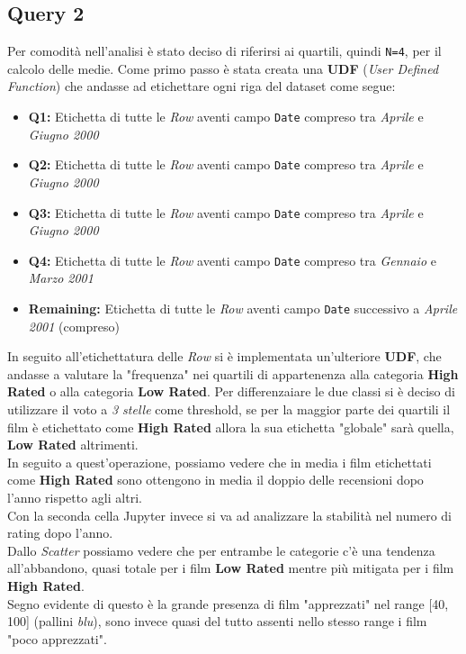 \documentclass{article}
\begin{document}
    \newpage
    \subsection{Query 2}
        Per comodità nell'analisi è stato deciso di riferirsi ai quartili, quindi \texttt{N=4}, per il calcolo delle medie. Come primo passo è stata creata una \textbf{UDF} (\textit{User Defined Function}) che andasse ad etichettare ogni riga del dataset come segue:
        \begin{itemize}
            \item \textbf{Q1:} Etichetta di tutte le \textit{Row} aventi campo \texttt{Date} compreso tra \textit{Aprile} e \textit{Giugno 2000}
            \item \textbf{Q2:} Etichetta di tutte le \textit{Row} aventi campo \texttt{Date} compreso tra \textit{Aprile} e \textit{Giugno 2000}
            \item \textbf{Q3:} Etichetta di tutte le \textit{Row} aventi campo \texttt{Date} compreso tra \textit{Aprile} e \textit{Giugno 2000}
            \item \textbf{Q4:} Etichetta di tutte le \textit{Row} aventi campo \texttt{Date} compreso tra \textit{Gennaio} e \textit{Marzo 2001}
            \item \textbf{Remaining:} Etichetta di tutte le \textit{Row} aventi campo \texttt{Date} successivo a \textit{Aprile 2001} (compreso)
        \end{itemize}
        In seguito all'etichettatura delle \textit{Row} si è implementata un'ulteriore \textbf{UDF}, che andasse a valutare la "frequenza" nei quartili di appartenenza alla categoria \textbf{High Rated} o alla categoria \textbf{Low Rated}. Per differenzaiare le due classi si è deciso di utilizzare il voto a \textit{3 stelle} come threshold, se per la maggior parte dei quartili il film è etichettato come \textbf{High Rated} allora la sua etichetta "globale" sarà quella, \textbf{Low Rated} altrimenti.\\
        In seguito a quest'operazione, possiamo vedere che in media i film etichettati come \textbf{High Rated} sono ottengono in media il doppio delle recensioni dopo l'anno rispetto agli altri.\\
        Con la seconda cella Jupyter invece si va ad analizzare la stabilità nel numero di rating dopo l'anno.\\
        Dallo \textit{Scatter} possiamo vedere che per entrambe le categorie c'è una tendenza all'abbandono, quasi totale per i film \textbf{Low Rated} mentre più mitigata per i film \textbf{High Rated}.\\
        Segno evidente di questo è la grande presenza di film "apprezzati" nel range [40, 100] (pallini \textit{blu}), sono invece quasi del tutto assenti nello stesso range i film "poco apprezzati".
\end{document}
